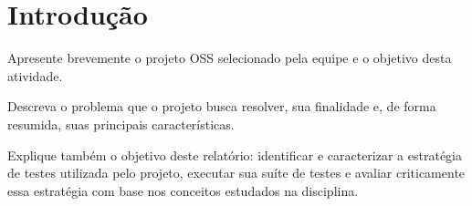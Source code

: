 \section{Introdução}

Apresente brevemente o projeto OSS selecionado pela equipe e
o objetivo desta atividade.

Descreva o problema que o projeto busca resolver, sua finalidade
e, de forma resumida, suas principais características.

Explique também o objetivo deste relatório: identificar e
caracterizar a estratégia de testes utilizada pelo projeto,
executar sua suíte de testes e avaliar criticamente essa estratégia
com base nos conceitos estudados na disciplina.
